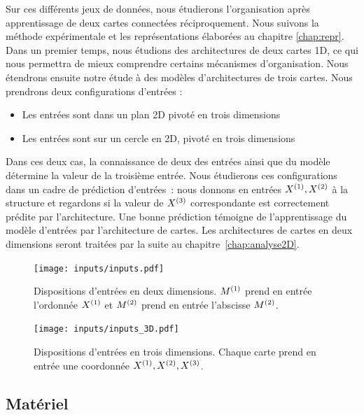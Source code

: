 \documentclass[../main]{subfiles}
\begin{document}
Sur ces différents jeux de données, nous étudierons l'organisation après apprentissage de deux cartes connectées réciproquement. Nous suivons la méthode expérimentale et les représentations élaborées au chapitre \ref{chap:repr}.
Dans un premier temps, nous étudions des architectures de deux cartes 1D, ce qui nous permettra de mieux comprendre certains mécanismes d'organisation.
Nous étendrons ensuite notre étude à des modèles d'architectures de trois cartes. Nous prendrons deux configurations d'entrées : 
\begin{itemize}
	\item Les entrées sont dans un plan 2D pivoté en trois dimensions
	\item Les entrées sont sur un cercle en 2D, pivoté en trois dimensions
\end{itemize}

Dans ces deux cas, la connaissance de deux des entrées ainsi que du modèle détermine la valeur de la troisième entrée. 
Nous étudierons ces configurations dans un cadre de prédiction d'entrées~: nous donnons en entrées $X^{({1})}, X^{({2})}$ à la structure et regardons si la valeur de $X^{({3})}$ correspondante est correctement prédite par l'architecture. 
Une bonne prédiction témoigne de l'apprentissage du modèle d'entrées par l'architecture de cartes.
Les architectures de cartes en deux dimensions seront traitées par la suite au chapitre~\ref{chap:analyse2D}.

\begin{figure}
	\texttt{[image: inputs/inputs.pdf]}
	\caption{Dispositions d'entrées en deux dimensions. $M^{({1})}$ prend en entrée l'ordonnée $X^{({1})}$ et $M^{({2})}$ prend en entrée l'abscisse $M^{({2})}$. \label{fig:input_list}}
\end{figure}

\begin{figure}
	\texttt{[image: inputs/inputs\_3D.pdf]}
	\caption{Dispositions d'entrées en trois dimensions. Chaque carte prend en entrée une coordonnée $X^{({1})}, X^{({2})}, X^{({3})}$. \label{fig:inputs_3D}}
\end{figure}


\subsection{Matériel}
\end{document}
